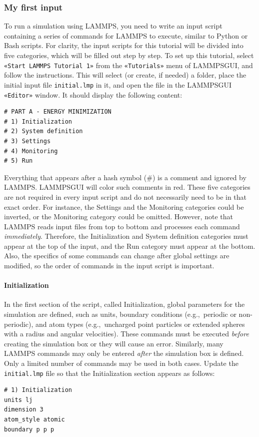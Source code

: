 \documentclass[9pt,tutorial]{livecoms}
\newcommand{\lmpcmd}[1]{\colorbox{listing}{\textcolor{command}{\small{#1}}}} %
\newcommand{\flecmd}[1]{\textcolor{command}{\texttt{#1}}} %
\newcommand{\guicmd}[1]{\textcolor{command}{\texttt{«#1»}}} %
\newcommand{\lammpsgui}{\textsf{LAMMPS\textendash GUI}}
\begin{document}
\subsubsection{My first input}

To run a simulation using LAMMPS, you need to write an input script
containing a series of commands for LAMMPS to execute, similar to Python
or Bash scripts.  For clarity, the input scripts for this tutorial will
be divided into five categories, which will be filled out step by step.
To set up this tutorial, select \guicmd{Start LAMMPS Tutorial 1} from
the \guicmd{Tutorials} menu of \lammpsgui{}, and follow the
instructions.  This will select (or create, if needed) a folder, place
the initial input file \flecmd{initial.lmp} in it, and open the file in
the \lammpsgui{} \guicmd{Editor} window.  It should display the following
content:
\begin{lstlisting}
# PART A - ENERGY MINIMIZATION
# 1) Initialization
# 2) System definition
# 3) Settings
# 4) Monitoring
# 5) Run
\end{lstlisting}
Everything that appears after a hash symbol ($\#$) is a comment
and ignored by LAMMPS.  \lammpsgui{} will color such comments in red.
These five categories are not required in every input script and do not
necessarily need to be in that exact order.  For instance, the \lmpcmd{Settings}
and the \lmpcmd{Monitoring} categories could be inverted, or
the \lmpcmd{Monitoring} category could be omitted.  However, note that
LAMMPS reads input files from top to bottom and processes each command
\emph{immediately}.  Therefore, the \lmpcmd{Initialization} and
\lmpcmd{System definition} categories must appear at the top of the
input, and the \lmpcmd{Run} category must appear at the bottom.  Also, the
specifics of some commands can change after global settings are modified, so the
order of commands in the input script is important.

\paragraph{Initialization}

In the first section of the script, called \lmpcmd{Initialization},
global parameters for the simulation are defined, such as units, boundary conditions
(e.g.,~periodic or non-periodic), and atom types (e.g.,~uncharged point particles
or extended spheres with a radius and angular velocities).  These commands must be
executed \emph{before} creating the simulation box or they will cause
an error.  Similarly, many LAMMPS commands may only be
entered \emph{after} the simulation box is defined.  Only a limited
number of commands may be used in both cases.  Update the \flecmd{initial.lmp} file
so that the \lmpcmd{Initialization} section appears as follows:
\begin{lstlisting}
# 1) Initialization
units lj
dimension 3
atom_style atomic
boundary p p p
\end{lstlisting}
\end{document}
